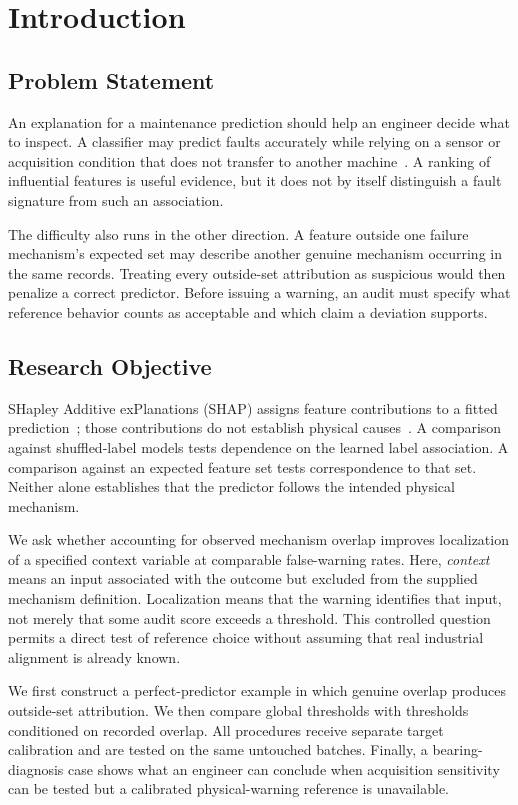 \documentclass[conference]{IEEEtran}
\begin{document}
\section{Introduction}
\label{sec:introduction}
\subsection{Problem Statement}
An explanation for a maintenance prediction should help an engineer decide what to inspect. A classifier may predict faults accurately while relying on a sensor or acquisition condition that does not transfer to another machine~\cite{geirhos2020shortcut,lapuschkin2019unmasking}. A ranking of influential features is useful evidence, but it does not by itself distinguish a fault signature from such an association.

The difficulty also runs in the other direction. A feature outside one failure mechanism's expected set may describe another genuine mechanism occurring in the same records. Treating every outside-set attribution as suspicious would then penalize a correct predictor. Before issuing a warning, an audit must specify what reference behavior counts as acceptable and which claim a deviation supports.

\subsection{Research Objective}
SHapley Additive exPlanations (SHAP) assigns feature contributions to a fitted prediction~\cite{lundberg2017shap}; those contributions do not establish physical causes~\cite{janzing2020feature,kumar2020problems}. A comparison against shuffled-label models tests dependence on the learned label association. A comparison against an expected feature set tests correspondence to that set. Neither alone establishes that the predictor follows the intended physical mechanism.

We ask whether accounting for observed mechanism overlap improves localization of a specified context variable at comparable false-warning rates. Here, \emph{context} means an input associated with the outcome but excluded from the supplied mechanism definition. Localization means that the warning identifies that input, not merely that some audit score exceeds a threshold. This controlled question permits a direct test of reference choice without assuming that real industrial alignment is already known.

We first construct a perfect-predictor example in which genuine overlap produces outside-set attribution. We then compare global thresholds with thresholds conditioned on recorded overlap. All procedures receive separate target calibration and are tested on the same untouched batches. Finally, a bearing-diagnosis case shows what an engineer can conclude when acquisition sensitivity can be tested but a calibrated physical-warning reference is unavailable.
\end{document}
